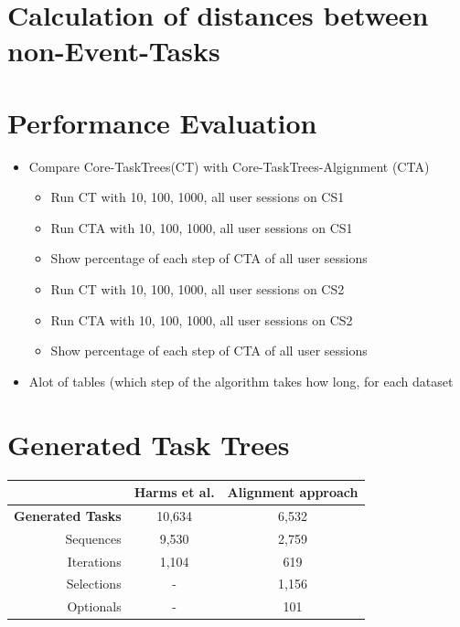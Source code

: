\section{Calculation of distances between non-Event-Tasks}

\section{Performance Evaluation}
\begin{itemize}
	\item Compare Core-TaskTrees(CT) with Core-TaskTrees-Algignment (CTA)
	\begin{itemize}
		\item Run CT with 10, 100, 1000, all user sessions on CS1
		\item Run CTA with 10, 100, 1000, all user sessions on CS1
		\item Show percentage of each step of CTA of all user sessions
		\item Run CT with 10, 100, 1000, all user sessions on CS2
		\item Run CTA with 10, 100, 1000, all user sessions on CS2
		\item Show percentage of each step of CTA of all user sessions
	\end{itemize}
	\item Alot of tables (which step of the algorithm takes how long, for each dataset
\end{itemize}

\section{Generated Task Trees}
\begin{table}
 \begin{tabular}{|r|c|c|}
	   \hline
	      & \textbf{Harms et al.} & \textbf{Alignment approach} \\
	     \hline
	       \textbf{Generated Tasks} & 10,634 & 6,532 \\
	       Sequences & 9,530 & 2,759 \\
	       Iterations & 1,104 & 619 \\
	       Selections & -& 1,156 \\
	       Optionals & -& 101 \\
	       \hline
\end{tabular}
\end{table}


